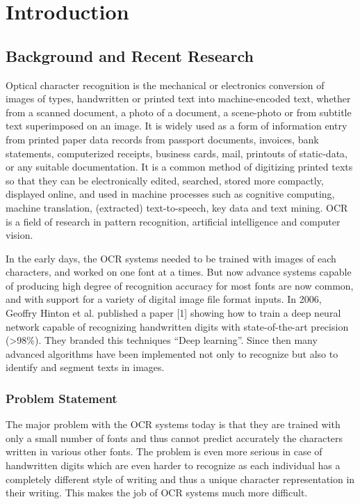\chapter{Introduction}

\section{Background and Recent Research}
Optical character recognition is the mechanical or electronics conversion of images of types, handwritten or printed text into machine-encoded text, whether from a scanned document, a photo of a document, a scene-photo or from subtitle text superimposed on an image. It is widely used as a form of information entry from printed paper data records from passport documents, invoices, bank statements, computerized receipts, business cards, mail, printouts of static-data, or any suitable documentation. It is a common method of digitizing printed texts so that they can be electronically edited, searched, stored more compactly, displayed online, and used in machine processes such as cognitive computing, machine translation, (extracted) text-to-speech, key data and text mining. OCR is a field of research in pattern recognition, artificial intelligence and computer vision.

In the early days, the OCR systems needed to be trained with images of each characters, and worked on one font at a times. But now advance systems capable of producing high degree of recognition accuracy for most fonts are now common, and with support for a variety of digital image file format inputs. In 2006, Geoffry Hinton et al. published a paper [1] showing how to train a deep neural network capable of recognizing handwritten digits with state-of-the-art precision (>98\%). They branded this techniques “Deep learning”. Since then many advanced algorithms have been implemented not only to recognize but also to identify and segment texts in images. 

\subsection{Problem Statement}
The major problem with the OCR systems today is that they are trained with only a small number of fonts and thus cannot predict accurately the characters written in various other fonts. The problem is even more serious in case of handwritten digits which are even harder to recognize as each individual has a completely different style of writing and thus a unique character representation in their writing. This makes the job of OCR systems much more difficult. 

